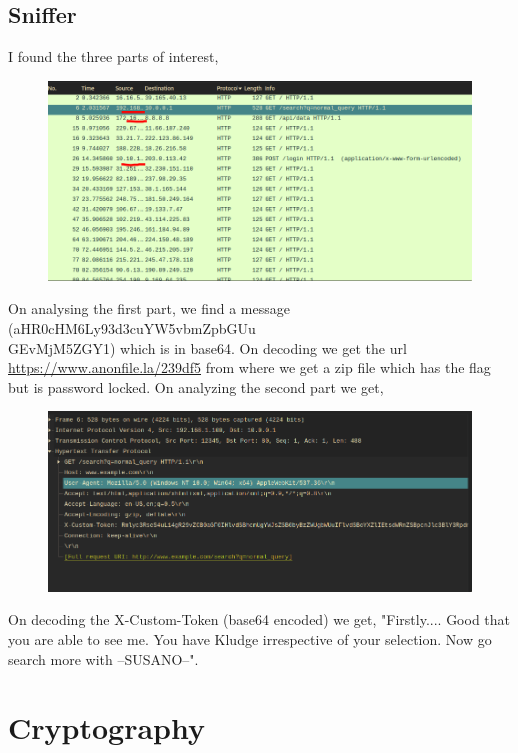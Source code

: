 \documentclass{article}
\begin{document}
\subsection{Sniffer}
I found the three parts of interest,
\begin{figure}[h!]
    \centering
    \includegraphics[width=1\linewidth]{figs/sniffer1.png}
    \label{fig:enter-label}
\end{figure}
\pagebreak 
\newline On analysing the first part, we find a message (aHR0cHM6Ly93d3cuYW5vbmZpbGUu\\GEvMjM5ZGY1) which is in base64. On decoding we get the url \url{https://www.anonfile.la/239df5} from where we get a zip file which has the flag but is password locked. On analyzing the second part we get, \pagebreak
\begin{figure}[h!]
    \centering
    \includegraphics[width=1\linewidth]{figs/sniffer3.png}
    \label{fig:enter-label}
\end{figure}
\newline On decoding the X-Custom-Token (base64 encoded) we get, "Firstly.... Good that you are able to see me. You have Kludge irrespective of your selection. Now go search more with --SUSANO--".
\section{Cryptography}
\end{document}
